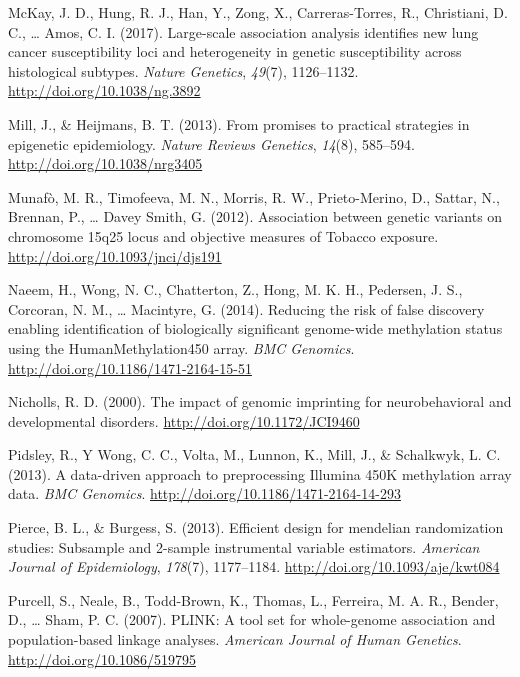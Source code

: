 \documentclass[11pt,twoside]{bristolthesis}
\newlength{\cslhangindent}
\newenvironment{cslreferences}%
  {\setlength{\parindent}{0pt}%
  \everypar{\setlength{\hangindent}{\cslhangindent}}\ignorespaces}%
  {\par}
\begin{document}
\begin{cslreferences}
\leavevmode\hypertarget{ref-McKay2017}{}%
McKay, J. D., Hung, R. J., Han, Y., Zong, X., Carreras-Torres, R., Christiani, D. C., \ldots{} Amos, C. I. (2017). Large-scale association analysis identifies new lung cancer susceptibility loci and heterogeneity in genetic susceptibility across histological subtypes. \emph{Nature Genetics}, \emph{49}(7), 1126--1132. \url{http://doi.org/10.1038/ng.3892}

\leavevmode\hypertarget{ref-Mill2013}{}%
Mill, J., \& Heijmans, B. T. (2013). From promises to practical strategies in epigenetic epidemiology. \emph{Nature Reviews Genetics}, \emph{14}(8), 585--594. \url{http://doi.org/10.1038/nrg3405}

\leavevmode\hypertarget{ref-Munafo2012}{}%
Munafò, M. R., Timofeeva, M. N., Morris, R. W., Prieto-Merino, D., Sattar, N., Brennan, P., \ldots{} Davey Smith, G. (2012). Association between genetic variants on chromosome 15q25 locus and objective measures of Tobacco exposure. \url{http://doi.org/10.1093/jnci/djs191}

\leavevmode\hypertarget{ref-Naeem2014}{}%
Naeem, H., Wong, N. C., Chatterton, Z., Hong, M. K. H., Pedersen, J. S., Corcoran, N. M., \ldots{} Macintyre, G. (2014). Reducing the risk of false discovery enabling identification of biologically significant genome-wide methylation status using the HumanMethylation450 array. \emph{BMC Genomics}. \url{http://doi.org/10.1186/1471-2164-15-51}

\leavevmode\hypertarget{ref-Nicholls2000}{}%
Nicholls, R. D. (2000). The impact of genomic imprinting for neurobehavioral and developmental disorders. \url{http://doi.org/10.1172/JCI9460}

\leavevmode\hypertarget{ref-Pidsley2013}{}%
Pidsley, R., Y Wong, C. C., Volta, M., Lunnon, K., Mill, J., \& Schalkwyk, L. C. (2013). A data-driven approach to preprocessing Illumina 450K methylation array data. \emph{BMC Genomics}. \url{http://doi.org/10.1186/1471-2164-14-293}

\leavevmode\hypertarget{ref-Pierce2013}{}%
Pierce, B. L., \& Burgess, S. (2013). Efficient design for mendelian randomization studies: Subsample and 2-sample instrumental variable estimators. \emph{American Journal of Epidemiology}, \emph{178}(7), 1177--1184. \url{http://doi.org/10.1093/aje/kwt084}

\leavevmode\hypertarget{ref-Purcell2007}{}%
Purcell, S., Neale, B., Todd-Brown, K., Thomas, L., Ferreira, M. A. R., Bender, D., \ldots{} Sham, P. C. (2007). PLINK: A tool set for whole-genome association and population-based linkage analyses. \emph{American Journal of Human Genetics}. \url{http://doi.org/10.1086/519795}


\end{cslreferences}
\end{document}
